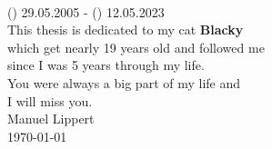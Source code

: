 \thispagestyle{empty}

\begin{center}
    \vspace*{3cm}
    \vspace{2cm}\\
    (\textborn) 29.05.2005 - (\textdied) 12.05.2023\\
    \bigskip
    This thesis is dedicated to my cat \textbf{Blacky}\\ which get nearly 19 years old and followed me\\ since I was 5 years through my life.\\You were always a big part of my life and\\ 
    \bigskip
    I will miss you.\\
    \bigskip
    Manuel Lippert\\
    \today
\end{center}
